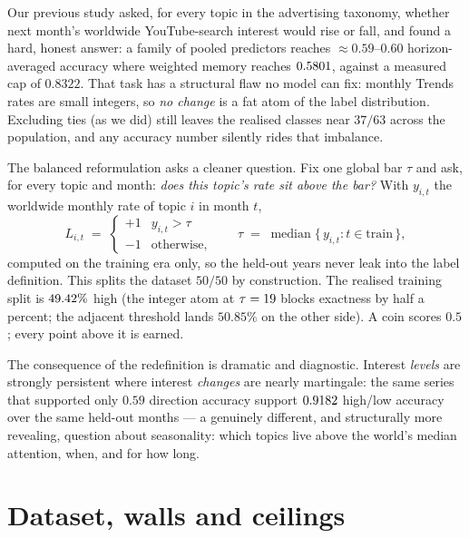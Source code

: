 \documentclass[11pt]{artaquest}
\begin{document}
Our previous study asked, for every topic in the advertising taxonomy, whether next month's
worldwide YouTube-search interest would rise or fall, and found a hard, honest answer: a family
of pooled predictors reaches ${\approx}0.59$--$0.60$ horizon-averaged accuracy where weighted
memory reaches $0.5801$, against a measured cap of $0.8322$. That task has a structural
flaw no model can fix: monthly Trends rates are small integers, so \emph{no change} is a fat
atom of the label distribution. Excluding ties (as we did) still leaves the realised classes
near $37/63$ across the population, and any accuracy number silently rides that imbalance.

The balanced reformulation asks a cleaner question. Fix one global bar $\tau$ and ask, for
every topic and month: \emph{does this topic's rate sit above the bar?} With $y_{i,t}$ the
worldwide monthly rate of topic $i$ in month $t$,
\begin{equation}
L_{i,t} \;=\; \begin{cases} +1 & y_{i,t} > \tau \\ -1 & \text{otherwise,} \end{cases}
\qquad
\tau \;=\; \operatorname{median}\bigl\{\, y_{i,t} : t \in \text{train} \,\bigr\},
\label{eq:label}
\end{equation}
computed on the training era only, so the held-out years never leak into the label
definition. This splits the dataset $50/50$ by construction. The realised training split is $49.42\%$ high (the integer atom at
$\tau=19$ blocks exactness by half a percent; the adjacent threshold lands $50.85\%$ on
the other side). A coin scores $0.5$; every point above it is earned.

The consequence of the redefinition is dramatic and diagnostic. Interest \emph{levels} are
strongly persistent where interest \emph{changes} are nearly martingale: the same series that
supported only $0.59$ direction accuracy support $0.9182$ high/low accuracy over the
same held-out months --- a genuinely different, and structurally more revealing, question about
seasonality: which topics live above the world's median attention, when, and for how long.

\section{Dataset, walls and ceilings}
\end{document}
